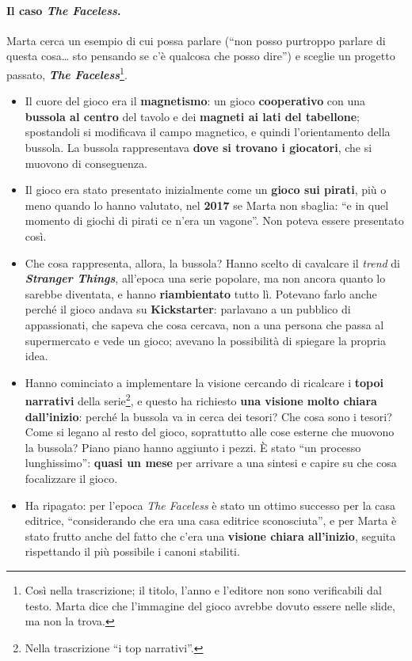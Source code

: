 \paragraph{Il caso \emph{The Faceless}.} Marta cerca un esempio di cui possa parlare
(``non posso purtroppo parlare di questa cosa\ldots{} sto pensando se c'è qualcosa che posso
dire'') e sceglie un progetto passato, \textbf{\emph{The Faceless}}\footnote{Così nella
trascrizione; il titolo, l'anno e l'editore non sono verificabili dal testo. Marta dice
che l'immagine del gioco avrebbe dovuto essere nelle slide, ma non la trova.}.
\begin{itemize}
  \item Il cuore del gioco era il \textbf{magnetismo}: un gioco \textbf{cooperativo} con una
        \textbf{bussola al centro} del tavolo e dei \textbf{magneti ai lati del tabellone};
        spostandoli si modificava il campo magnetico, e quindi l'orientamento della bussola.
        La bussola rappresentava \textbf{dove si trovano i giocatori}, che si muovono di
        conseguenza.
  \item Il gioco era stato presentato inizialmente come un \textbf{gioco sui pirati}, più o
        meno quando lo hanno valutato, nel \textbf{2017} se Marta non sbaglia: ``e in quel
        momento di giochi di pirati ce n'era un vagone''. Non poteva essere presentato così.
  \item Che cosa rappresenta, allora, la bussola? Hanno scelto di cavalcare il \emph{trend}
        di \textbf{\emph{Stranger Things}}, all'epoca una serie popolare, ma non ancora
        quanto lo sarebbe diventata, e hanno \textbf{riambientato} tutto lì. Potevano farlo
        anche perché il gioco andava su \textbf{Kickstarter}: parlavano a un pubblico di
        appassionati, che sapeva che cosa cercava, non a una persona che passa al
        supermercato e vede un gioco; avevano la possibilità di spiegare la propria idea.
  \item Hanno cominciato a implementare la visione cercando di ricalcare i
        \textbf{topoi narrativi} della serie\footnote{Nella trascrizione ``i top
        narrativi''.}, e questo ha richiesto \textbf{una visione molto chiara dall'inizio}:
        perché la bussola va in cerca dei tesori? Che cosa sono i tesori? Come si legano al
        resto del gioco, soprattutto alle cose esterne che muovono la bussola? Piano piano
        hanno aggiunto i pezzi. È stato ``un processo lunghissimo'': \textbf{quasi un mese}
        per arrivare a una sintesi e capire su che cosa focalizzare il gioco.
  \item Ha ripagato: per l'epoca \emph{The Faceless} è stato un ottimo successo per la casa
        editrice, ``considerando che era una casa editrice sconosciuta'', e per Marta è
        stato frutto anche del fatto che c'era una \textbf{visione chiara all'inizio}, seguita
        rispettando il più possibile i canoni stabiliti.
\end{itemize}

